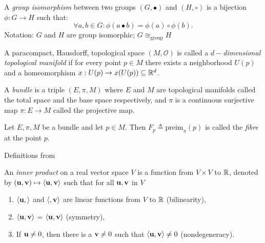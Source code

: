 \begin{definition}
    A \emph{group isomorphism} between two groups \((G, \bullet)\) and \((H, \circ)\) is a bijection \(\phi: G \to H\) such that:
    \[ \forall a, b \in G: \phi(a\bullet b) = \phi(a) \circ \phi(b).\]
    Notation: \(G\) and \(H\) are group isomorphic; \(G \cong_\text{group} H\)
\end{definition}

\begin{definition}
    A paracompact, Hausdorff, topological space \((M, \mathscr{O})\) is called a 
    \(d-\)\emph{dimensional topological manifold} if for every point \(p \in M\) there exists a neighborhood \(U(p)\) and a homeomorphism \(x: U(p)\to x(U(p)) \subseteq \mathbb{R}^d\).
\end{definition}

\begin{definition}[Bundle]
    A \emph{bundle} is a triple \((E, \pi, M)\) where \(E\) and \(M\) are topological manifolds called the total space and the base space respectively, and \(\pi\) is a continuous surjective map \(\pi: E \to M\) called the projective map.
\end{definition}

\begin{definition}[Fibre]
    Let \(E, \pi, M\) be a bundle and let \(p \in M\). Then \(F_p \triangleq \text{preim}_\pi ({p})\) is called the \emph{fibre} at the point \(p\).
\end{definition}


Definitions from \cite{Lee2000}

\begin{definition}
    An \emph{inner product} on a real vector space $V$ is a function from $V \times V$ to $\mathbb{R}$, denoted by $(\vb{u}, \vb{v}) \mapsto \langle \vb{u}, \vb{v} \rangle$ such that for all $\vb{u}, \vb{v}$ in $V$
    \begin{enumerate}
        \item $\langle \vb{u}, \rangle$ and $\langle, \vb{v}\rangle$ are linear functions from $V$ to $\mathbb{R}$ (bilinearity),
        \item $\langle \vb{u}, \vb{v} \rangle$ = $\langle \vb{u}, \vb{v} \rangle$ (symmetry),
        \item If $\vb{u} \neq 0$, then there is a $\vb{v} \neq 0$ such that $\langle \vb{u}, \vb{v} \rangle \neq 0$ (nondegeneracy).
    \end{enumerate}
\end{definition}



